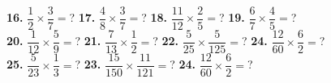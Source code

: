 \documentclass[a4paper]{article}
\begin{document}
\begin{Large}
\textbf{16.} $\dfrac{1}{2} \times \dfrac{3}{7} =$? \hspace{0.2cm}
\textbf{17.} $\dfrac{4}{8} \times \dfrac{3}{7} =$? \hspace{0.2cm}
\textbf{18.} $\dfrac{11}{12} \times \dfrac{2}{5} =$? \hspace{0.2cm}
\textbf{19.} $\dfrac{6}{7} \times \dfrac{4}{5} =$?  \\[0.75cm]
\textbf{20.} $\dfrac{1}{12} \times \dfrac{5}{9} =$? \hspace{0.2cm}
\textbf{21.} $\dfrac{7}{13} \times \dfrac{1}{2} =$? \hspace{0.2cm}
\textbf{22.} $\dfrac{5}{25} \times \dfrac{5}{125} =$? \hspace{0.2cm}
\textbf{24.} $\dfrac{12}{60} \times \dfrac{6}{2} =$?  \\[0.75cm]
\textbf{25.} $\dfrac{5}{23} \times \dfrac{1}{3} =$? \hspace{0.2cm}
\textbf{23.} $\dfrac{15}{150} \times \dfrac{11}{121} =$? \hspace{0.2cm}
\textbf{24.} $\dfrac{12}{60} \times \dfrac{6}{2} =$?

\end{Large}
\end{document}
